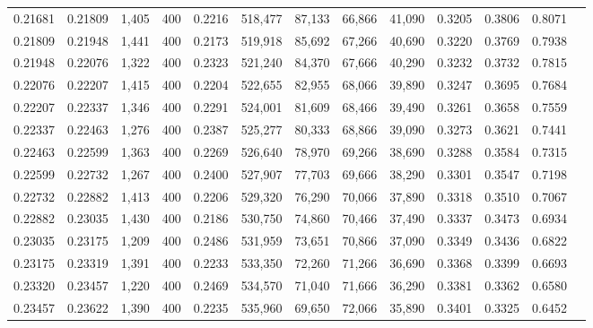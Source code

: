\begin{tabular}{rrrrrrrrrrrrr}
0.21681 & 0.21809 &  1,405 & 400 &                                     0.2216 & 518,477 &  87,133 &  66,866 &  41,090 & 0.3205 & 0.3806 & 0.8071 \\
0.21809 & 0.21948 &  1,441 & 400 &                                     0.2173 & 519,918 &  85,692 &  67,266 &  40,690 & 0.3220 & 0.3769 & 0.7938 \\
0.21948 & 0.22076 &  1,322 & 400 &                                     0.2323 & 521,240 &  84,370 &  67,666 &  40,290 & 0.3232 & 0.3732 & 0.7815 \\
0.22076 & 0.22207 &  1,415 & 400 &                                     0.2204 & 522,655 &  82,955 &  68,066 &  39,890 & 0.3247 & 0.3695 & 0.7684 \\
0.22207 & 0.22337 &  1,346 & 400 &                                     0.2291 & 524,001 &  81,609 &  68,466 &  39,490 & 0.3261 & 0.3658 & 0.7559 \\
0.22337 & 0.22463 &  1,276 & 400 &                                     0.2387 & 525,277 &  80,333 &  68,866 &  39,090 & 0.3273 & 0.3621 & 0.7441 \\
0.22463 & 0.22599 &  1,363 & 400 &                                     0.2269 & 526,640 &  78,970 &  69,266 &  38,690 & 0.3288 & 0.3584 & 0.7315 \\
0.22599 & 0.22732 &  1,267 & 400 &                                     0.2400 & 527,907 &  77,703 &  69,666 &  38,290 & 0.3301 & 0.3547 & 0.7198 \\
0.22732 & 0.22882 &  1,413 & 400 &                                     0.2206 & 529,320 &  76,290 &  70,066 &  37,890 & 0.3318 & 0.3510 & 0.7067 \\
0.22882 & 0.23035 &  1,430 & 400 &                                     0.2186 & 530,750 &  74,860 &  70,466 &  37,490 & 0.3337 & 0.3473 & 0.6934 \\
0.23035 & 0.23175 &  1,209 & 400 &                                     0.2486 & 531,959 &  73,651 &  70,866 &  37,090 & 0.3349 & 0.3436 & 0.6822 \\
0.23175 & 0.23319 &  1,391 & 400 &                                     0.2233 & 533,350 &  72,260 &  71,266 &  36,690 & 0.3368 & 0.3399 & 0.6693 \\
0.23320 & 0.23457 &  1,220 & 400 &                                     0.2469 & 534,570 &  71,040 &  71,666 &  36,290 & 0.3381 & 0.3362 & 0.6580 \\
0.23457 & 0.23622 &  1,390 & 400 &                                     0.2235 & 535,960 &  69,650 &  72,066 &  35,890 & 0.3401 & 0.3325 & 0.6452 \\

\end{tabular}
